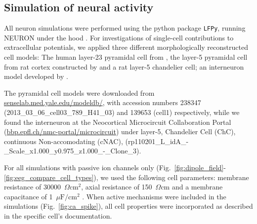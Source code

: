 \documentclass[preprint,10pt,authoryear]{elsarticle}
\newcommand{\hlb}[2][NavyBlue]{ {\sethlcolor{#1} \hl{#2}} }
\newcommand{\hlg}[2][Emerald]{ {\sethlcolor{#1} \hl{#2}} }
\newcommand{\snnote}[1]{\color{white}{\hlb{SN: #1 }}\color{black}}
\newcommand{\tvnnote}[1]{\color{white}{\hlg{TVN: #1 }}\color{black}}
\newcommand{\tvntxt}[1]{{\color{Emerald}#1}}
\begin{document}


\subsection{Simulation of neural activity}\label{subsec:simulation}
All neuron simulations were performed using the python package \texttt{LFPy}, running NEURON under the hood \citep{HAGEN2018}. 
For investigations of single-cell contributions to extracellular potentials, we applied three different morphologically reconstructed cell models: The human layer-23 pyramidal cell from \cite{EYAL2018}, the layer-5 pyramidal cell from rat cortex constructed by \cite{HAY2011} and a rat layer-5 chandelier cell; an interneuron model developed by \cite{MARKRAM2015}.

The pyramidal cell models were downloaded from \url{senselab.med.yale.edu/modeldb/}, with accession numbers 238347 (2013\_03\_06\_cell03\_789\_H41\_03) and 139653 (cell1) respectively, while we found the interneuron at the Neocortical Microcircuit Collaboration Portal (\url{bbp.epfl.ch/nmc-portal/microcircuit}) under layer-5, Chandelier Cell (ChC), continuous Non-accomodating (cNAC), (rp110201\_L\_idA\_-\_Scale\_x1.000\_y0.975\_z1.000\_-\_Clone\_3). %

For all simulations with passive ion channels only (Fig.~\ref{fig:dipole_field}-\ref{fig:eeg_compare_cell_types}), 
we used the following cell parameters: membrane resistance of 30000~$\Omega \text{cm}^2$, axial resistance of 150~$\Omega \text{cm}$ \citep{MAINEN1996} and a membrane capacitance of 1~$\mu\text{F}/\text{cm}^2$ %
\citep{GENTET2000,STERRATT2011}. When active mechanisms were included in the simulations (Fig.~\ref{fig:ca_spike}), all cell properties were incorporated as described in the specific cell's documentation.
\end{document}
